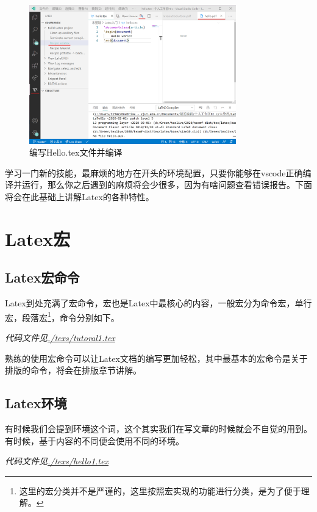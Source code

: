 \documentclass{article}
\begin{document}
            \begin{figure}[H]
                \centering
                \includegraphics[width=0.8\textwidth]{snaps/snap1.png}
                \caption{编写Hello.tex文件并编译}
                \label{snap1}
            \end{figure}

            学习一门新的技能，最麻烦的地方在开头的环境配置，只要你能够在vscode正确编译并运行，那么你之后遇到的麻烦将会少很多，因为有啥问题查看错误报告。下面将会在此基础上讲解Latex的各种特性。
    \section{Latex宏}
        \subsection{Latex宏命令}
        Latex到处充满了宏命令，宏也是Latex中最核心的内容，一般宏分为命令宏，单行宏，段落宏\footnote{这里的宏分类并不是严谨的，这里按照宏实现的功能进行分类，是为了便于理解。}，命令分别如下。

        
        \textit{代码文件见\url{./texs/tutoral1.tex}}

        熟练的使用宏命令可以让Latex文档的编写更加轻松，其中最基本的宏命令是关于排版的命令，将会在排版章节讲解。

        \subsection{Latex环境}
        有时候我们会提到环境这个词，这个其实我们在写文章的时候就会不自觉的用到。有时候，基于内容的不同便会使用不同的环境。

        
        \textit{代码文件见\url{./texs/hello1.tex}}
\end{document}
